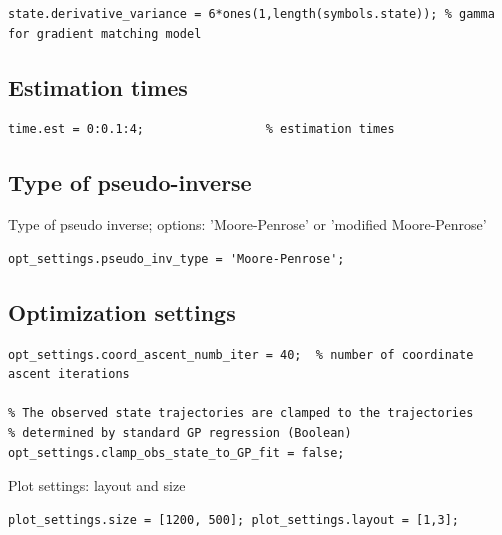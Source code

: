 \color{RoyalPurple}\begin{verbatim}
state.derivative_variance = 6*ones(1,length(symbols.state)); % gamma for gradient matching model
\end{verbatim}
\color{black}
\begin{par}
\subsection{ Estimation times }
\end{par} \vspace{1em}
\color{RoyalPurple}\begin{verbatim}
time.est = 0:0.1:4;                 % estimation times
\end{verbatim}
\color{black}
\begin{par}
\subsection{ Type of pseudo-inverse } Type of pseudo inverse; options: 'Moore-Penrose' or 'modified Moore-Penrose'
\end{par} \vspace{1em}
\color{RoyalPurple}\begin{verbatim}
opt_settings.pseudo_inv_type = 'Moore-Penrose';
\end{verbatim}
\color{black}
\begin{par}
\subsection{ Optimization settings }
\end{par} \vspace{1em}
\color{RoyalPurple}\begin{verbatim}
opt_settings.coord_ascent_numb_iter = 40;  % number of coordinate ascent iterations

% The observed state trajectories are clamped to the trajectories
% determined by standard GP regression (Boolean)
opt_settings.clamp_obs_state_to_GP_fit = false;
\end{verbatim}
\color{black}
\begin{par}
Plot settings: layout and size
\end{par} \vspace{1em}
\color{RoyalPurple}\begin{verbatim}
plot_settings.size = [1200, 500]; plot_settings.layout = [1,3];
\end{verbatim}
\color{black}


